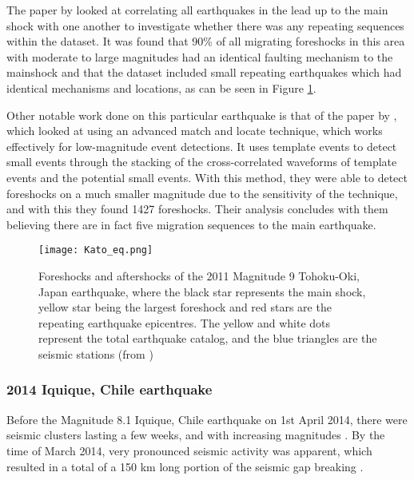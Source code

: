 \documentclass[12pt]{report}
\begin{document}
The paper by \cite{Kato2012} looked at correlating all earthquakes in the lead up to the main shock with one another to investigate whether there was any repeating sequences within the dataset. It was found that 90\% of all migrating foreshocks in this area with moderate to large magnitudes had an identical faulting mechanism to the mainshock and that the dataset included small repeating earthquakes which had identical mechanisms and locations, as can be seen in Figure \ref{Kato_eq}. 


Other notable work done on this particular earthquake is that of the paper by \cite{Zhang2015}, which looked at using an advanced match and locate technique, which works effectively for low-magnitude event detections. It uses template events to detect small events through the stacking of the cross-correlated waveforms of template events and the potential small events. With this method, they were able to detect foreshocks on a much smaller magnitude due to the sensitivity of the technique, and with this they found 1427 foreshocks. Their analysis concludes with them believing there are in fact five migration sequences to the main earthquake. 

\begin{figure}[h]
	\begin{center}
		\texttt{[image: Kato\_eq.png]}
		\caption{Foreshocks and aftershocks of the 2011 Magnitude 9 Tohoku-Oki, Japan earthquake, where the black star represents the main shock, yellow star being the largest foreshock and red stars are the repeating earthquake epicentres. The yellow and white dots represent the total earthquake catalog, and the blue triangles are the seismic stations (from \cite{Kato2012})}
		\label{Kato_eq}
	\end{center}
\end{figure}

\FloatBarrier


\subsubsection{2014 Iquique, Chile earthquake}
Before the Magnitude 8.1 Iquique, Chile earthquake on 1st April 2014, there were seismic clusters lasting a few weeks, and with increasing magnitudes \citep{Schurr2014}. By the time of March 2014, very pronounced seismic activity was apparent, which resulted in a total of a 150 km long portion of the seismic gap breaking \citep{Ruiz2014}. 
\end{document}
